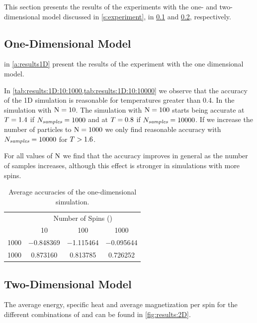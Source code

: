 This section presents the results of the experiments with the one- and two- dimensional model discussed in \cref{s:experiment}, in \cref{ss:results:1D} and \cref{ss:results:2D}, respectively.

\subsection{One-Dimensional Model}
\label{ss:results:1D}
	 in \cref{a:results1D} present the results of the experiment with the one dimensional model.

	In \cref{tab:results:1D:10:1000,tab:results:1D:10:10000} we observe that the accuracy of the 1D simulation is reasonable for temperatures greater than 0.4. In the simulation with $\mathrm{N} = 10$. 
	The simulation with $\mathrm{N} = 100$ starts being accurate at $T = 1.4$ if $N_\textit{samples} = 1000$ and at $T = 0.8$ if $N_\textit{samples} = 10000$. 
	If we increase the number of particles to $\mathrm{N} = 1000$ we only find reasonable accuracy with $N_\textit{samples} = 10000$ for $T > 1.6$.

	For all values of $\mathrm{N}$ we find that the accuracy improves in general as the number of samples increases, although this effect is stronger in simulations with more spins.

	\begin{table}
		\centering
		\caption{Average accuracies of the one-dimensional simulation.}
		\begin{tabular}{cccc}
			\toprule
			~ & \multicolumn{3}{c}{Number of Spins (\numberOfSpins)}\\ 
			\cmidrule(r){2-4}
			\numberOfSamples & 10 & 100 & 1000 \\
			 \midrule 
			 1000 & \num{-0.848369} & \num{-1.115464} & \num{-0.095644}\\
			 1000 & \num{0.873160} & \num{0.813785} & \num{0.726252}\\
			\bottomrule
		\end{tabular}
		\label{tab:results:1D:averageAccuracies}			
	\end{table}

\subsection{Two-Dimensional Model}
\label{ss:results:2D}
	The average energy, specific heat and average magnetization per spin for the different combinations of \numberOfSpins and \numberOfSamples can be found in \cref{fig:results:2D}. 


